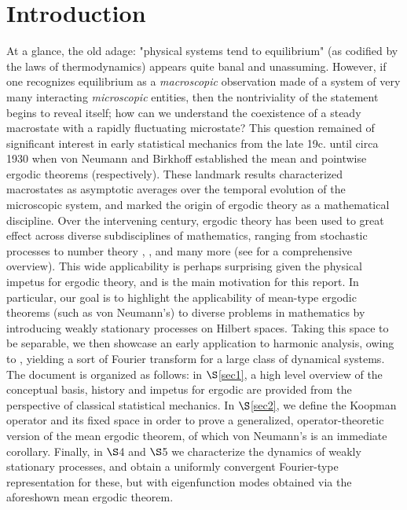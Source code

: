 \documentclass[11pt]{report}
\newcommand{\1}[1]{\mathbbm{1}_{\{#1\}}}
\theoremstyle{definition}
\begin{document}
    \section{Introduction}\label{sec0} At a glance, the old adage: "physical systems tend to
    equilibrium" (as codified by the laws of thermodynamics) appears quite banal
    and unassuming. However, if one recognizes equilibrium as a
    \textit{macroscopic} observation made of a system of very many interacting
    \textit{microscopic} entities, then the nontriviality of the statement
    begins to reveal itself; how can we understand the coexistence of a steady
    macrostate with a rapidly fluctuating microstate? This question remained of
    significant interest in early statistical mechanics from the late 19c. until
    circa 1930 when von Neumann \cite{Neumann_1932} and Birkhoff
    \cite{Birkhoff_1931} established the mean and pointwise ergodic theorems
    (respectively). These landmark results characterized macrostates as
    asymptotic averages over the temporal evolution of the microscopic system,
    and marked the origin of ergodic theory as a mathematical discipline. Over
    the intervening century, ergodic theory has been used to great effect across
    diverse subdisciplines of mathematics, ranging from stochastic processes
    \cite[theorem 17.0.1]{Meyn_Tweedie_1993} to number theory
    \cite{Furstenberg_1977}, \cite{Gorodnik_Nevo_2015}, \cite{Green_Tao_2008}
    and many more (see \cite{Eisner_Farkas_Haase_Nagel_2015} for a comprehensive
    overview). This wide applicability is perhaps surprising given the physical
    impetus for ergodic theory, and is the main motivation for this report. In
    particular, our goal is to highlight the applicability of mean-type ergodic
    theorems (such as von Neumann's) to diverse problems in mathematics by
    introducing weakly stationary processes on Hilbert spaces. Taking this
    space to be separable, we then showcase an early application to harmonic
    analysis, owing to \cite{Fan_1946}, yielding a sort of Fourier transform for
    a large class of dynamical systems.\\[5pt]
    \indent The document is organized as follows: in $\S$\ref{sec1}, a high
    level overview of the conceptual basis, history and impetus for ergodic are
    provided from the perspective of classical statistical mechanics. In
    $\S$\ref{sec2}, we define the Koopman operator and its fixed space in order
    to prove a generalized, operator-theoretic version of the mean ergodic
    theorem, of which von Neumann's is an immediate corollary. Finally, in $\S$4
    and $\S$5 we characterize the dynamics of weakly stationary processes, and
    obtain a uniformly convergent Fourier-type representation for these, but with
    eigenfunction modes obtained via the aforeshown mean ergodic theorem.
\end{document}
